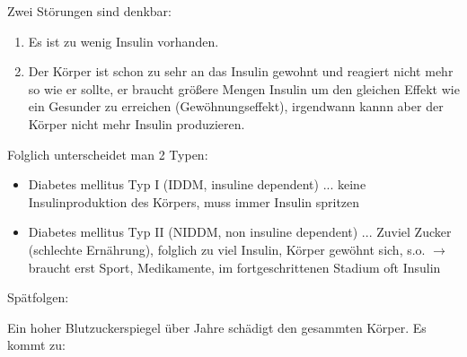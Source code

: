 \documentclass{article}
\begin{document}
Zwei St\"orungen sind denkbar:

\begin{enumerate}
\item Es ist zu wenig Insulin vorhanden.

\item Der K\"orper ist schon zu sehr an das Insulin gewohnt und reagiert
nicht mehr so wie er sollte, er braucht gr\"o{\ss}ere Mengen Insulin um
den gleichen Effekt wie ein Gesunder zu erreichen (Gew\"ohnungseffekt),
irgendwann kannn aber der K\"orper nicht mehr Insulin produzieren.

\end{enumerate}
Folglich unterscheidet man 2 Typen:

\begin{itemize}
\item Diabetes mellitus Typ I  (IDDM, insuline dependent) ... keine
Insulinproduktion des K\"orpers, muss  immer Insulin spritzen 

\item Diabetes mellitus Typ II (NIDDM, non insuline dependent) ...
Zuviel Zucker (schlechte Ern\"ahrung), folglich zu viel Insulin,
K\"orper gew\"ohnt sich, s.o. ${\rightarrow}$ braucht erst Sport,
Medikamente, im fort\-ge\-schrittenen Stadium oft Insulin

\end{itemize}
Sp\"atfolgen:

Ein hoher Blutzuckerspiegel \"uber Jahre sch\"adigt den gesammten
K\"orper. Es kommt zu:
\end{document}
